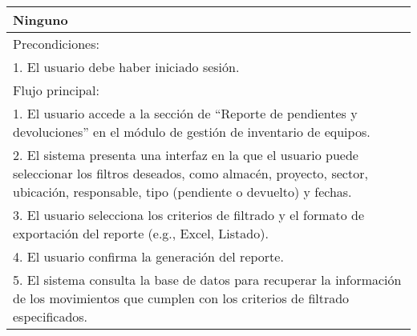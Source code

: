 \documentclass[stu, 12pt, letterpaper, donotrepeattitle, floatsintext, natbib]{apa7}
\begin{document}
\begin{longtable}{@{} p{16.5cm} @{}}
    Ninguno                                                                                                                                                                                                                                                                          \\ \midrule
    Precondiciones:                                                                                                                                                                                                                                                                  \\
    1. El usuario debe haber iniciado sesi\'on.                                                                                                                                                                                                                                      \\ \midrule
    Flujo principal:                                                                                                                                                                                                                                                                 \\
    1. El usuario accede a la secci\'on de ``Reporte de pendientes y devoluciones'' en el m\'odulo de gesti\'on de inventario de equipos.                                                                                                                                            \\
    2. El sistema presenta una interfaz en la que el usuario puede seleccionar los filtros deseados, como almac\'en, proyecto, sector, ubicaci\'on, responsable, tipo (pendiente o devuelto) y fechas.                                                                               \\
    3. El usuario selecciona los criterios de filtrado y el formato de exportaci\'on del reporte (e.g., Excel, Listado).                                                                                                                                                             \\
    4. El usuario confirma la generaci\'on del reporte.                                                                                                                                                                                                                              \\
    5. El sistema consulta la base de datos para recuperar la informaci\'on de los movimientos que cumplen con los criterios de filtrado especificados.                                                                                                                              \\

\end{longtable}
\end{document}
